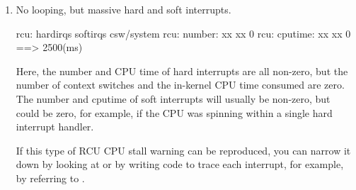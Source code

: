 \begin{enumerate}
\item No looping, but massive hard and soft interrupts.

\begin{VerbatimU}
     rcu:          hardirqs   softirqs   csw/system
     rcu:  number:       xx         xx            0
     rcu: cputime:       xx         xx            0   ==> 2500(ms)
\end{VerbatimU}

   Here, the number and CPU time of hard interrupts are all non-zero,
   but the number of context switches and the in-kernel CPU time consumed
   are zero.
   The number and cputime of soft interrupts will usually be
   non-zero, but could be zero, for example, if the CPU was spinning
   within a single hard interrupt handler.

   If this type of RCU CPU stall warning can be reproduced, you can
   narrow it down by looking at  or by writing code to
   trace each interrupt, for example, by referring to .
\end{enumerate}
